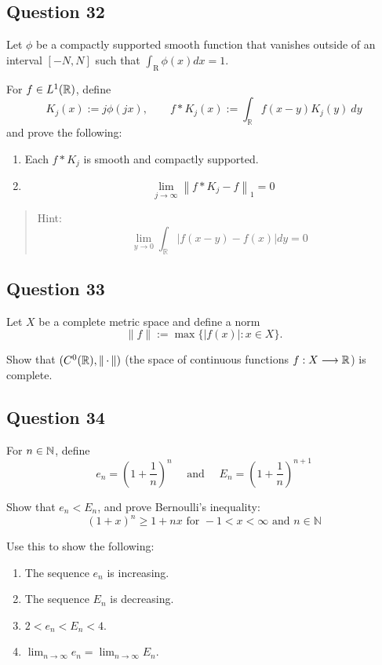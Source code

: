 \documentclass[12pt]{article}
\providecommand{\tightlist}{%
  \setlength{\itemsep}{0pt}\setlength{\parskip}{0pt}}
\begin{document}
\hypertarget{question-32-1}{%
\subsection{Question 32}\label{question-32-1}}

Let \(\phi\) be a compactly supported smooth function that vanishes
outside of an interval \([-N, N]\) such that
\(\int_{\mathrm{R}} \phi(x) d x=1\).

For \(f\in L^1({\mathbb{R}})\), define \[
K_{j}(x):=j \phi(j x), \quad \quad f \ast K_{j}(x):=\int_{\mathbb{R}} f(x-y) K_{j}(y) ~d y
\] and prove the following:

\begin{enumerate}
\def\labelenumi{\arabic{enumi}.}
\item
  Each \(f\ast K_j\) is smooth and compactly supported.
\item
  \[
  \lim _{j \rightarrow \infty}\left\|f * K_{j}-f\right\|_{1}=0
  \]
\end{enumerate}

\begin{quote}
Hint: \[
\lim _{y \rightarrow 0} \int_{\mathbb{R}}|f(x-y)-f(x)| d y=0
\]
\end{quote}

\hypertarget{question-33-1}{%
\subsection{Question 33}\label{question-33-1}}

Let \(X\) be a complete metric space and define a norm \[
\|f\|:=\max \{|f(x)|: x \in X\}.
\]

Show that \((C^0({\mathbb{R}}), {\left\lVert {{\,\cdot\,}} \right\rVert} )\) (the space of continuous
functions \(f: X\longrightarrow {\mathbb{R}}\)) is complete.

\hypertarget{question-34-1}{%
\subsection{Question 34}\label{question-34-1}}

For \(n\in {\mathbb{N}}\), define \[
e_{n}=\left(1+\frac{1}{n}\right)^{n} 
\quad \text { and } \quad 
E_{n}=\left(1+\frac{1}{n}\right)^{n+1}
\]

Show that \(e_n < E_n\), and prove Bernoulli's inequality: \[
(1+x)^{n} \geq 1+n x \text { for }-1<x<\infty \text { and } n \in \mathbb{N}
\]

Use this to show the following:

\begin{enumerate}
\def\labelenumi{\arabic{enumi}.}
\tightlist
\item
  The sequence \(e_n\) is increasing.
\item
  The sequence \(E_n\) is decreasing.
\item
  \(2 < e_n < E_n < 4\).
\item
  \(\lim _{n \rightarrow \infty} e_{n}=\lim _{n \rightarrow \infty} E_{n}\).
\end{enumerate}
\end{document}
